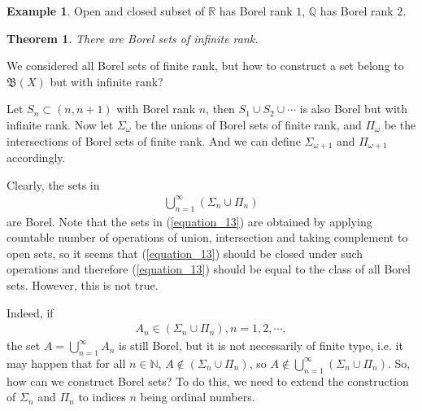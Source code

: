 \documentclass[11pt]{book}
\newtheorem{theorem}{Theorem}[chapter]
\theoremstyle{definition}
\newtheorem{example}{Example}[chapter]
\numberwithin{equation}{chapter}
\begin{document}
\medskip

\begin{example}
Open and closed subset of $\mathbb{R}$ has Borel rank $1$, $\mathbb{Q}$ has Borel rank $2$.
\end{example}

\medskip

\begin{theorem}
There are Borel sets of infinite rank.
\end{theorem}

\medskip

We considered all Borel sets of finite rank, but how to construct a set belong to $\mathfrak{B}(X)$ but with infinite rank?

Let $S_n \subset (n,n+1)$ with Borel rank $n$, then $S_1 \cup S_2 \cup \cdots$ is also Borel but with infinite rank. Now let $\Sigma_\omega$ be the unions of Borel sets of finite rank, and $\Pi_\omega$ be the intersections of Borel sets of finite rank. And we can define $\Sigma_{\omega+1}$ and $\Pi_{\omega+1}$ accordingly. 

Clearly, the sets in 
\begin{align}\label{equation_13}
    \bigcup^\infty_{n=1} (\Sigma_n \cup \Pi_n)
\end{align}
are Borel. Note that the sets in (\ref{equation_13}) are obtained by applying countable number of operations of union, intersection and taking complement to open sets, so it seems that (\ref{equation_13}) should be closed under such operations and therefore (\ref{equation_13}) should be equal to the class of all Borel sets. However, this is not true.

Indeed, if 
\begin{align*}
    A_n \in (\Sigma_n \cup \Pi_n), n = 1,2,\cdots,
\end{align*}
the set $A = \bigcup^\infty_{n=1} A_n$ is still Borel, but it is not necessarily of finite type, i.e. it may happen that for all $n \in \mathbb{N}$, $A \notin (\Sigma_n \cup \Pi_n)$, so $A \notin \bigcup^\infty_{n=1} (\Sigma_n \cup \Pi_n)$. So, how can we construct Borel sets? To do this, we need to extend the construction of $\Sigma_n$ and $\Pi_n$ to indices $n$ being ordinal numbers. 
\end{document}
